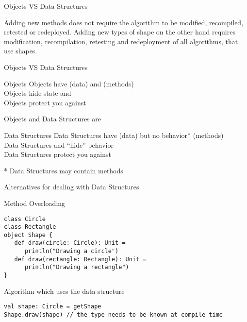 \begin{frame}[fragile]{Objects VS Data Structures}
\begin{center}
Adding new methods does not require the algorithm to be modified, recompiled,
retested or redeployed. Adding new types of shape on the other
hand requires modification, recompilation, retesting and redeployment of
\alert{all} algorithms, that use shapes.
\end{center}
\end{frame}

\begin{frame}{Objects VS Data Structures}
\begin{block}{Objects}
Objects have  (data) and  (methods)\\
Objects \alert{hide state} and \\
Objects protect you against \\
\end{block}
\begin{center}
Objects and Data Structures are 
\end{center}
\begin{block}{Data Structures}
Data Structures have  (data) but \alert{no behavior}* (methods)\\
Data Structures  and \alert{``hide'' behavior}\\
Data Structures protect you against \\
\end{block}
* Data Structures may contain  methods
\end{frame}

\begin{frame}[fragile]{Alternatives for dealing with Data Structures}
\begin{block}{Method Overloading}
\begin{lstlisting}
class Circle
class Rectangle
object Shape {
   def draw(circle: Circle): Unit =
      println("Drawing a circle")
   def draw(rectangle: Rectangle): Unit =
      println("Drawing a rectangle")
}
\end{lstlisting}
\end{block}
\pause
\begin{alertblock}{Algorithm which uses the data structure}
\begin{lstlisting}
val shape: Circle = getShape
Shape.draw(shape) // the type needs to be known at compile time
\end{lstlisting}
\end{alertblock}
\end{frame}

